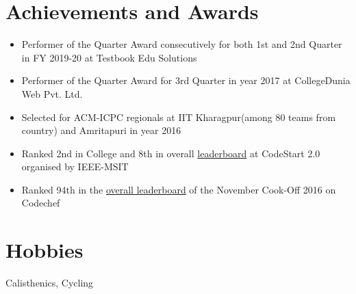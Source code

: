 \documentclass[margin, centered]{res}
\begin{document}
\begin{resume}
\section{Achievements and Awards}
\begin{itemize}[leftmargin=*] 
 \item Performer of the Quarter Award consecutively for both 1st and 2nd Quarter in FY 2019-20 at Testbook Edu Solutions
 \item Performer of the Quarter Award for 3rd Quarter in year 2017 at CollegeDunia Web Pvt. Ltd.
 \item Selected for ACM-ICPC regionals at IIT Kharagpur(among 80 teams from country) and Amritapuri in year 2016
 \item Ranked 2nd in College and 8th in overall \href {https://www.hackerearth.com/CodeStart2/leaderboard/}{leaderboard} at CodeStart 2.0 organised by IEEE-MSIT
 \item Ranked 94th in the \href {https://www.codechef.com/rankings/COOK76}{overall leaderboard} of the November Cook-Off 2016 on Codechef
\end{itemize}


\section{Hobbies}
Calisthenics, Cycling

\end{resume}
\end{document}

